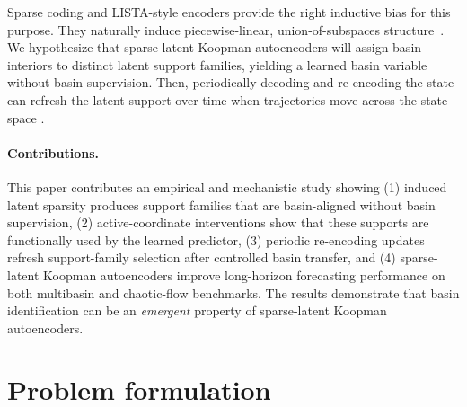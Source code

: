 \documentclass[11pt]{article}
\theoremstyle{plain}
\theoremstyle{definition}
\begin{document}
Sparse coding and LISTA-style encoders provide the right inductive bias for this purpose. They naturally induce piecewise-linear, union-of-subspaces structure~\citep{olshausen_emergence_1996,chen_atomic_1998,donoho_optimally_2003,gregor_learning_2010}.
We hypothesize that sparse-latent Koopman autoencoders will assign basin interiors to distinct latent support families, yielding a learned basin variable without basin supervision.
Then, periodically decoding and re-encoding the state can refresh the latent support over time when trajectories move across the state space \citep{fathi2024course}.




\paragraph{Contributions.} This paper contributes an empirical and mechanistic study showing (1) induced latent sparsity produces support families that are basin-aligned without basin supervision, (2) active-coordinate interventions show that these supports are functionally used by the learned predictor, (3) periodic re-encoding updates \citep{fathi2024course} refresh support-family selection after controlled basin transfer, and (4) sparse-latent Koopman autoencoders improve long-horizon forecasting performance on both multibasin and chaotic-flow benchmarks.
The results demonstrate that basin identification can be an \textit{emergent} property of sparse-latent Koopman autoencoders.

\section{Problem formulation}
\label{sec:problem}
\end{document}

